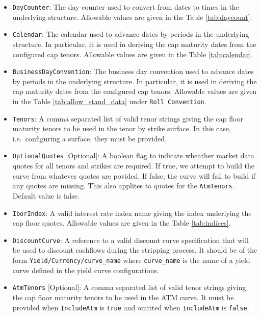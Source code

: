\begin{itemize}
\item \lstinline!DayCounter!:
The day counter used to convert from dates to times in the underlying structure. Allowable values are given in the Table \ref{tab:daycount}.

\item \lstinline!Calendar!:
The calendar used to advance dates by periods in the underlying structure. In particular, it is used in deriving the cap maturity dates from the configured cap tenors. Allowable values are given in the Table \ref{tab:calendar}.

\item \lstinline!BusinessDayConvention!:
The business day convention used to advance dates by periods in the underlying structure. In particular, it is used in deriving the cap maturity dates from the configured cap tenors. Allowable values are given in the Table \ref{tab:allow_stand_data} under \lstinline!Roll Convention!.

\item \lstinline!Tenors!:
A comma separated list of valid tenor strings giving the cap floor maturity tenors to be used in the tenor by strike surface. In this case, i.e.\ configuring a surface, they must be provided.

\item \lstinline!OptionalQuotes! [Optional]:
A boolean flag to indicate wheather market data quotes for all tenors and strikes are required. If true, we attempt to build the curve from whatever quotes are povided. If false, the curve will fail to build if any quotes are missing. This also applites to quotes for the \lstinline!AtmTenors!. Default value is false.

\item \lstinline!IborIndex!:
A valid interest rate index name giving the index underlying the cap floor quotes. Allowable values are given in the Table \ref{tab:indices}.

\item \lstinline!DiscountCurve!:
A reference to a valid discount curve specification that will be used to discount cashflows during the stripping process. It should be of the form \lstinline!Yield/Currency/curve_name! where \lstinline!curve_name! is the name of a yield curve defined in the yield curve configurations.

\item \lstinline!AtmTenors! [Optional]:
A comma separated list of valid tenor strings giving the cap floor maturity tenors to be used in the ATM curve. It must be provided when \lstinline!IncludeAtm! is \lstinline!true! and omitted when \lstinline!IncludeAtm! is \lstinline!false!.


\end{itemize}
